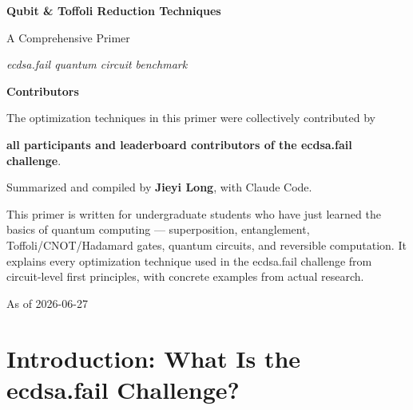 \documentclass[11pt,a4paper]{article}
\begin{document}

\begin{titlepage}
\centering
\vspace*{2cm}
{\LARGE\bfseries\color{accent} Qubit \& Toffoli Reduction Techniques\par}
\vspace{0.4cm}
{\Large A Comprehensive Primer\par}
\vspace{1.2cm}
{\large\itshape ecdsa.fail quantum circuit benchmark\par}
\vspace{1.6cm}
{\large\bfseries Contributors\par}
\vspace{0.3cm}
{\normalsize The optimization techniques in this primer were collectively contributed by\par
\textbf{all participants and leaderboard contributors of the ecdsa.fail challenge}.\par}
\vspace{0.5cm}
{\normalsize Summarized and compiled by \textbf{Jieyi Long}, with Claude Code.\par}
\vspace{2.0cm}
\begin{tcolorbox}[definitionbox, title=Audience note]
This primer is written for undergraduate students who have just learned the basics of quantum
computing --- superposition, entanglement, Toffoli/CNOT/Hadamard gates, quantum circuits, and
reversible computation. It explains every optimization technique used in the ecdsa.fail challenge
from circuit-level first principles, with concrete examples from actual research.
\end{tcolorbox}
\vfill
{\small As of 2026-06-27\par}
\end{titlepage}

\tableofcontents
\newpage

\section{Introduction: What Is the ecdsa.fail Challenge?}
\label{sec:intro}
\end{document}
